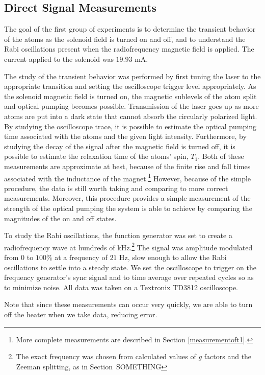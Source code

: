 \subsection{Direct Signal Measurements}\label{directsignalmeasurements}

The goal of the first group of experiments is to determine the transient behavior of the atoms as the solenoid field is turned on and off, and to understand the Rabi oscillations present when the radiofrequency magnetic field is applied. The current applied to the solenoid was $19.93$ mA.

The study of the transient behavior was performed by first tuning the laser to the appropriate transition and setting the oscilloscope trigger level appropriately. As the solenoid magnetic field is turned on, the magnetic sublevels of the atom split and optical pumping becomes possible. Transmission of the laser goes up as more atoms are put into a dark state that cannot absorb the circularly polarized light. By studying the oscilloscope trace, it is possible to estimate the optical pumping time associated with the atoms and the given light intensity. Furthermore, by studying the decay of the signal after the magnetic field is turned off, it is possible to estimate the relaxation time of the atoms' spin, $T_{1}$. Both of these measurements are approximate at best, because of the finite rise and fall times associated with the inductance of the magnet.\footnote{More complete measurements are described in Section \ref{measurementoft1}.} However, because of the simple procedure, the data is still worth taking and comparing to more correct measurements. Moreover, this procedure provides a simple measurement of the strength of the optical pumping the system is able to achieve by comparing the magnitudes of the on and off states.

To study the Rabi oscillations, the function generator was set to create a radiofrequency wave at hundreds of kHz.\footnote{The exact frequency was chosen from calculated values of $g$ factors and the Zeeman splitting, as in Section~SOMETHING} The signal was amplitude modulated from $0$ to $100\%$ at a frequency of $21$ Hz, slow enough to allow the Rabi oscillations to settle into a steady state. We set the oscilloscope to trigger on the frequency generator's sync signal and to time average over repeated cycles so as to minimize noise. All data was taken on a Textronix TD3812 oscilloscope.

Note that since these measurements can occur very quickly, we are able to turn off the heater when we take data, reducing error.

